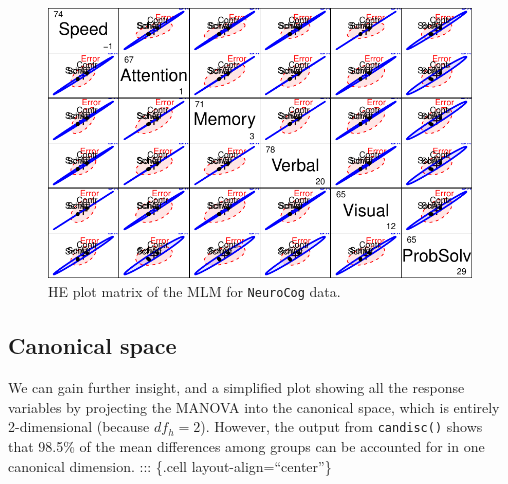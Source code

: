 \documentclass[
  letterpaper,
  10pt,
  krantz2]{krantz}
\begin{document}
\begin{figure}[H]

{\centering \includegraphics[width=1\textwidth,height=\textheight]{figs/fig-NC-HE-pairs-1.pdf}

}

\caption{\label{fig-NC-HE-pairs}HE plot matrix of the MLM for
\texttt{NeuroCog} data.}

\end{figure}

\hypertarget{canonical-space}{%
\subsection{Canonical space}\label{canonical-space}}

We can gain further insight, and a simplified plot showing all the
response variables by projecting the MANOVA into the canonical space,
which is entirely 2-dimensional (because \(df_h=2\)). However, the
output from \texttt{candisc()} shows that 98.5\% of the mean differences
among groups can be accounted for in one canonical dimension. :::
\{.cell layout-align=``center''\}
\end{document}
